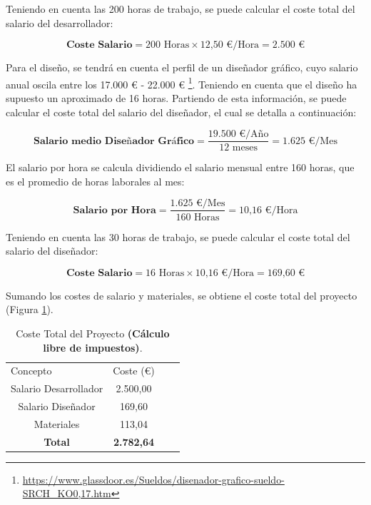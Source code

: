 Teniendo en cuenta las 200 horas de trabajo, se puede calcular el coste total del salario del desarrollador:

\begin{equation}
    \textbf{Coste Salario} = \text{200 Horas} \times \text{12,50 €/Hora} = \text{2.500 €}
\end{equation}

Para el diseño, se tendrá en cuenta el perfil de un diseñador gráfico, cuyo salario anual oscila entre los 17.000 € - 22.000 € \footnote{\url{https://www.glassdoor.es/Sueldos/disenador-grafico-sueldo-SRCH_KO0,17.htm}}. Teniendo en cuenta que el diseño ha supuesto un aproximado de 16 horas. Partiendo de esta información, se puede calcular el coste total del salario del diseñador, el cual se detalla a continuación:

\begin{equation}
    \textbf{Salario medio Diseñador Gráfico} =  \frac {\text{19.500 €/Año} }{ \text{12 meses}} = \text{1.625 €/Mes}
\end{equation}

El salario por hora se calcula dividiendo el salario mensual entre 160 horas, que es el promedio de horas laborales al mes:

\begin{equation}
    \textbf{Salario por Hora} = \frac {\text{1.625 €/Mes}}{160 \text{ Horas}} = \text{10,16 €/Hora}
\end{equation}

Teniendo en cuenta las 30 horas de trabajo, se puede calcular el coste total del salario del diseñador:

\begin{equation}
    \textbf{Coste Salario} = \text{16 Horas} \times \text{10,16 €/Hora} = \text{169,60 €}
\end{equation}

Sumando los costes de salario y materiales, se obtiene el coste total del proyecto (Figura \ref{tab:coste_total}).

\begin{table}[H]
    \centering
    \begin{tabular}{|c|c|ll}
    \cline{1-2}
    \multicolumn{1}{|l|}{Concepto} & \multicolumn{1}{l|}{Coste (€)} &  &  \\ \cline{1-2}
    Salario Desarrollador           & 2.500,00                        &  &  \\ \cline{1-2}
    Salario Diseñador               & 169,60                         &  &  \\ \cline{1-2}
    Materiales                      & 113,04                       &  &  \\ \cline{1-2}
    \textbf{Total}                   & \textbf{2.782,64}               &  &  \\ \cline{1-2}
    \end{tabular}
    \caption{Coste Total del Proyecto \textbf{(Cálculo libre de impuestos)}.}
    \label{tab:coste_total}
\end{table}
